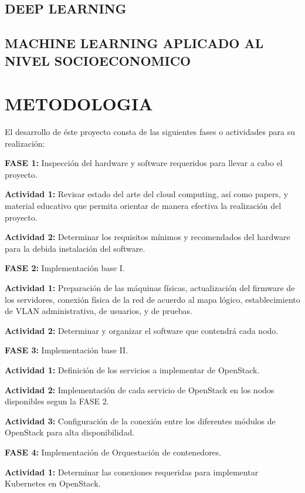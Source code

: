     \section{DEEP LEARNING}
    \section{MACHINE LEARNING APLICADO AL NIVEL SOCIOECONOMICO}
    
  
      \newpage\chapter{METODOLOGIA} 
    
    
    El desarrollo de éste proyecto consta de las siguientes fases o actividades para su realización: 
    
 \textbf{FASE 1:} Inspección del hardware y software requeridos para llevar a cabo el proyecto. 
 
 \textbf{Actividad 1:} Revisar estado del arte del cloud computing, así como papers, y             material educativo que permita orientar de manera efectiva la realización del           proyecto. 
 
 \textbf{Actividad 2:} Determinar los requisitos mínimos y recomendados del hardware para           la debida instalación del software. 
 
 \textbf{FASE 2:} Implementación base I. 
 
 \textbf{Actividad 1:} Preparación de las máquinas físicas, actualización del firmware de los servidores, conexión física de la red de acuerdo al mapa lógico, establecimiento de VLAN administrativa, de usuarios, y de pruebas. 
 
 \textbf{Actividad 2:} Determinar y organizar el software que contendrá cada nodo. 

 \textbf{FASE 3:} Implementación base II. 
 
 \textbf{Actividad 1:} Definición de los servicios a implementar de OpenStack. 
 
 \textbf{Actividad 2:} Implementación de cada servicio de OpenStack en los nodos disponibles segun la FASE 2. 
 
 \textbf{Actividad 3:} Configuración de la conexión entre los diferentes módulos de OpenStack para alta disponibilidad. 
 
 \textbf{FASE 4:} Implementación de Orquestación de contenedores. 
 
 \textbf{Actividad 1:} Determinar las conexiones requeridas para implementar Kubernetes en OpenStack. 
 
